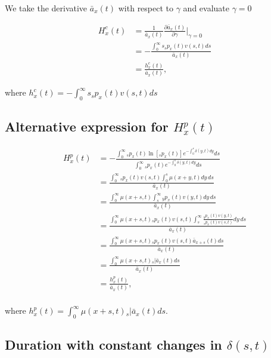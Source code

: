 \documentclass[12pt]{article}
\begin{document}
We take the derivative $\bar{a}_{x}(t)$ with respect to $\gamma$ and evaluate $\gamma=0$


\begin{equation}\label{eq:EntropyConst3}
\begin{split}
{H}^{c}_x(t)&=\frac{1}{\bar{a}_x(t)}\frac{\partial \bar{a}_x(t)}{\partial \gamma} \bigg\rvert_{\gamma=0}\\
&= -\frac{\int_0^\infty s {}_sp_x(t) {v}(s,t)ds}{\bar{a}_x(t)} \\
&= \frac{{h}^{c}_x(t)}{\bar{a}_x(t)},
\end{split}
\end{equation}

where ${h}^{c}_x(t)=-\int_0^\infty s {}_sp_x(t) {v}(s,t)ds$



\subsection{Alternative expression for ${H}^{p}_{x}(t)$}\label{sec:EntropyAlt}

\begin{equation} \label{eq:EntropyAnnuityA1}
\begin{split}
{H}^{p}_{x}(t) &= -\frac{ \int_{0}^{\infty}{}_sp_x(t)\ln[{}_sp_x(t)] e^{-\int_{0}^{s}\delta(y,t)dy} ds}{\int_0^\infty {}_sp_x(t) e^{-\int_{0}^{s}\delta(y,t)dy} ds}\\
&= \frac{\int_0^\infty {}_sp_x(t) {v}(s,t) \int_0^s \mu(x+y,t) dy\,ds}{\bar{a}_x(t)}\\
&= \frac{\int_0^\infty  \mu(x+s,t) \int_s^\infty {}_yp_x(t) {v}(y,t)  dy\,ds}{\bar{a}_x(t)}\\
&= \frac{\int_0^\infty  \mu(x+s,t)  {}_sp_x(t) {v}(s,t) \int_s^\infty \frac{ {}_yp_x(t) {v}(y,t)}{ {}_sp_x(t) {v}(s,t)}  dy\,ds}{\bar{a}_x(t)}\\
&=  \frac{\int_0^\infty \mu(x+s,t)   {}_sp_x(t) {v}(s,t) \bar{a}_{x+s}(t) ds}{\bar{a}_x(t)} \\
&=  \frac{\int_0^\infty \mu(x+s,t)  {}_s|\bar{a}_x(t) ds}{\bar{a}_x(t)} \\
&=  \frac{{h}^{p}_{x}(t)}{\bar{a}_x(t)}, \\
\end{split}
\end{equation}

where ${h}^{p}_{x}(t)=\int_0^\infty \mu(x+s,t)   {}_s|\bar{a}_x(t) ds$.



\subsection{Duration with constant changes in $\delta(s,t)$}\label{sec:DurConst}
\end{document}
